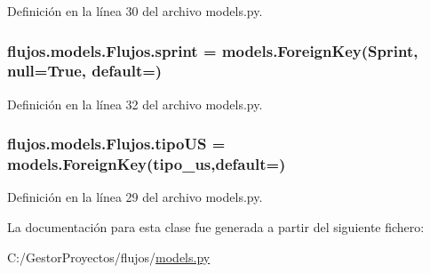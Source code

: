 Definición en la línea 30 del archivo models.\+py.

\subsubsection[{\texorpdfstring{sprint}{sprint}}]{\setlength{\rightskip}{0pt plus 5cm}flujos.\+models.\+Flujos.\+sprint = models.\+Foreign\+Key({\bf Sprint}, null=True, default=\textquotesingle{}\textquotesingle{})\hspace{0.3cm}{\ttfamily [static]}}\hypertarget{classflujos_1_1models_1_1_flujos_abd0b6bdf2feb2a6e41794ac5a3aa0ad2}{}\label{classflujos_1_1models_1_1_flujos_abd0b6bdf2feb2a6e41794ac5a3aa0ad2}


Definición en la línea 32 del archivo models.\+py.

\subsubsection[{\texorpdfstring{tipo\+US}{tipoUS}}]{\setlength{\rightskip}{0pt plus 5cm}flujos.\+models.\+Flujos.\+tipo\+US = models.\+Foreign\+Key({\bf tipo\+\_\+us},default=\textquotesingle{}\textquotesingle{})\hspace{0.3cm}{\ttfamily [static]}}\hypertarget{classflujos_1_1models_1_1_flujos_a13493fb05b460c32b47d5cd43eed6eb2}{}\label{classflujos_1_1models_1_1_flujos_a13493fb05b460c32b47d5cd43eed6eb2}


Definición en la línea 29 del archivo models.\+py.



La documentación para esta clase fue generada a partir del siguiente fichero\+:\begin{DoxyCompactItemize}
\item 
C\+:/\+Gestor\+Proyectos/flujos/\hyperlink{flujos_2models_8py}{models.\+py}\end{DoxyCompactItemize}

